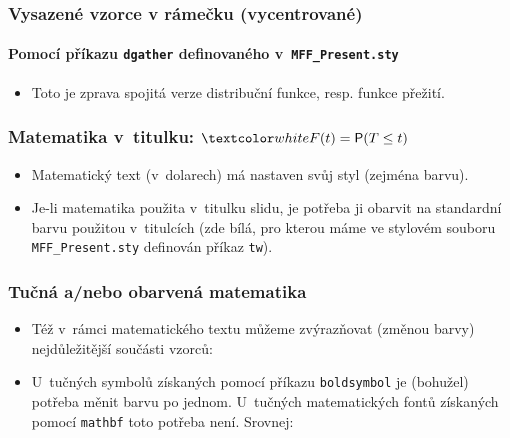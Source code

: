 \documentclass[c, 10pt]{beamer}
\begin{document}
\begin{frame}\frametitle{Vysazené vzorce v rámečku (vycentrované)}
\framesubtitle{Pomocí příkazu \texttt{dgather} definovaného v~\texttt{MFF\_{}Present.sty}}

\begin{itemize}
\item Toto je \alert{zprava} spojitá verze distribuční funkce,
  resp. funkce přežití.
\end{itemize}
\end{frame}

\begin{frame}\frametitle{Matematika v~titulku: $\tw{F(t) = \mathsf{P}(T \leq t)}$}

\begin{itemize}\itemsep=1em
\item Matematický text (v~dolarech) má nastaven svůj styl (zejména barvu).
\item Je-li matematika použita v~titulku slidu, je potřeba ji obarvit na
   standardní barvu použitou v~titulcích (zde bílá, pro kterou máme 
   ve stylovém souboru \texttt{MFF\_{}Present.sty} definován příkaz \texttt{tw}).
\end{itemize}

\end{frame}

\begin{frame}\frametitle{Tučná a/nebo obarvená matematika}

\begin{itemize}\itemsep=1ex
\item Též v~rámci matematického textu můžeme zvýrazňovat (změnou barvy) nejdůležitější součásti vzorců:

\item U~tučných symbolů získaných pomocí příkazu \texttt{boldsymbol} 
  je (bohužel) potřeba měnit barvu po jednom. U~tučných matematických fontů
  získaných pomocí \texttt{mathbf} toto potřeba není. Srovnej:
\end{itemize}

\end{frame}
\end{document}
